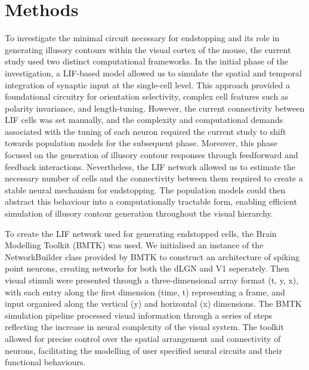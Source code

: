 \documentclass[12pt]{article}
\begin{document}
\section*{Methods}
\setlength{\parindent}{24pt}
To investigate the minimal circuit necessary for endstopping and its role in generating illusory contours within the visual cortex of the mouse, the current study used two distinct computational frameworks. In the initial phase of the investigation, a LIF-based model allowed us to simulate the spatial and temporal integration of synaptic input at the single-cell level. This approach provided a foundational circuitry for orientation selectivity, complex cell features such as polarity invariance, and length-tuning. However, the current connectivity between LIF cells was set manually, and the complexity and computational demands associated with the tuning of each neuron required the current study to shift towards population models for the subsequent phase. Moreover, this phase focused on the generation of illusory contour responses through feedforward and feedback interactions. Nevertheless, the LIF network allowed us to estimate the necessary number of cells and the connectivity between them required to create a stable neural mechanism for endstopping. The population models could then abstract this behaviour into a computationally tractable form, enabling efficient simulation of illusory contour generation throughout the visual hierarchy.
\setlength{\parindent}{0pt}


To create the LIF network used for generating endstopped cells, the Brain Modelling Toolkit (BMTK) was used. We initialised an instance of the NetworkBuilder class provided by BMTK to construct an architecture of spiking point neurons, creating networks for both the dLGN and V1 seperately. Then visual stimuli were presented through a three-dimensional array format (t, y, x), with each entry along the first dimension (time, t) representing a frame, and input organised along the vertical (y) and horizontal (x) dimensions. The BMTK simulation pipeline processed visual information through a series of steps reflecting the increase in neural complexity of the visual system. The toolkit allowed for precise control over the spatial arrangement and connectivity of neurons, facilitating the modelling of user specified neural circuits and their functional behaviours.
\end{document}
